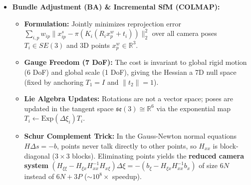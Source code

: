 \documentclass[11pt,a4paper]{article}
\theoremstyle{definition}
\theoremstyle{plain}
\theoremstyle{remark}
\begin{document}
\begin{itemize}
    \begin{itemize}
        \item \textbf{Essential Matrix ($E = [t]_\times R$):} Operates on calibrated rays $\tilde{x}_i = K_i^{-1}\bar{x}_i$ via $\tilde{x}_2^\top E \tilde{x}_1 = 0$. Has \textbf{rank 2}, \textbf{5 DoF} (3 rot + 3 trans $-$ 1 scale), and singular values $(\sigma, \sigma, 0)$. Estimated via the \textbf{normalized 8-point algorithm} (SVD + projecting singular values to $(1,1,0)$) or minimal \textbf{5-point solver} inside RANSAC.
        \item \textbf{4-Fold Decomposition \& Cheirality:} Decomposing $E = U\operatorname{diag}(1,1,0)V^\top$ yields 4 pose candidates: $(U W V^\top$ or $U W^\top V^\top)$ and $t = \pm u_3$ (baseline sign flip + $180^\circ$ twisted pair rotation). Only \textbf{1 solution} puts triangulated points in front of \emph{both} cameras ($z_1 > 0, z_2 > 0$, \textbf{cheirality check}).
        \item \textbf{Fundamental Matrix ($F = K_2^{-\top} E K_1^{-1}$):} Used when intrinsics $K_i$ are unknown ($\bar{x}_2^\top F \bar{x}_1 = 0$); rank 2, \textbf{7 DoF}.
        \item \textbf{Triangulation \& Parallax Trade-off:} Linear DLT ($\bar{x}_i \times P_i \tilde{x}_w = 0$) or nonlinear reprojection minimization. \textbf{Trade-off:} Small baseline/parallax angle $\gamma$ makes feature matching easy, but rays are nearly parallel so depth uncertainty explodes ($\sigma_Z \propto 1/\gamma$); wide baseline gives accurate triangulation but hard matching.
    \end{itemize}
    \item \textbf{Bundle Adjustment (BA) \& Incremental SfM (COLMAP):}
    \begin{itemize}
        \item \textbf{Formulation:} Jointly minimizes reprojection error $\sum_{i,p} w_{ip} \|x_{ip}^s - \pi(K_i(R_i x_p^w + t_i))\|_2^2$ over all camera poses $T_i \in SE(3)$ and 3D points $x_p^w \in \mathbb{R}^3$.
        \item \textbf{Gauge Freedom (7 DoF):} The cost is invariant to global rigid motion (6 DoF) and global scale (1 DoF), giving the Hessian a 7D null space (fixed by anchoring $T_1 = I$ and $\|t_2\|=1$).
        \item \textbf{Lie Algebra Updates:} Rotations are not a vector space; poses are updated in the tangent space $\mathfrak{se}(3) \cong \mathbb{R}^6$ via the exponential map $T_i \leftarrow \text{Exp}(\Delta\xi_i) T_i$.
        \item \textbf{Schur Complement Trick:} In the Gauss-Newton normal equations $H\Delta s = -b$, points never talk directly to other points, so $H_{xx}$ is block-diagonal ($3\times 3$ blocks). Eliminating points yields the \textbf{reduced camera system} $(H_{\xi\xi} - H_{\xi x}H_{xx}^{-1}H_{x\xi})\Delta\xi = -(b_\xi - H_{\xi x}H_{xx}^{-1}b_x)$ of size $6N$ instead of $6N + 3P$ ($\sim 10^8\times$ speedup).

\end{itemize}
\end{itemize}
\end{document}
